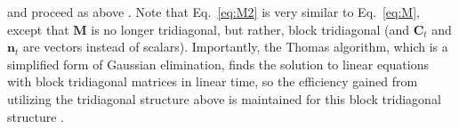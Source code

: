 \documentclass{article}
\providecommand{\ve}[1]{\boldsymbol{#1}}
\newcommand{\T}{^{\ensuremath{\mathsf{T}}}}           %
\newcommand{\bb}{\ve{b}}
\newcommand{\bn}{\ve{n}}
\newcommand{\bC}{\ve{C}}
\newcommand{\bM}{\ve{M}}
\newcommand{\gam}{\gamma}
\begin{document}
\noindent and proceed as above%
.  Note that Eq.~\eqref{eq:M2} is very similar to Eq.~\eqref{eq:M}, except that $\bM$ is no longer tridiagonal, but rather, block tridiagonal (and $\bC_t$ and $\bn_t$ are vectors instead of scalars).  Importantly, the Thomas algorithm, which is a simplified form of Gaussian elimination, finds the solution to linear equations with block tridiagonal matrices in linear time, so the efficiency gained from utilizing the tridiagonal structure above is maintained for this block tridiagonal structure \cite{Press92}.   
\end{document}
